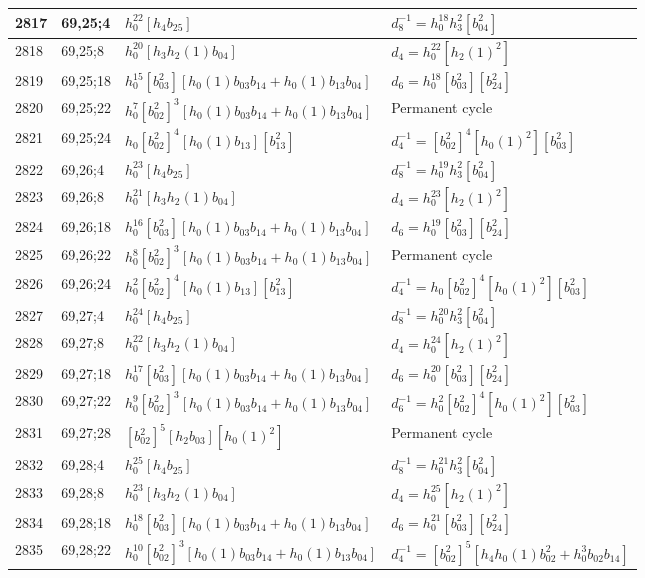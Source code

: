 \documentclass{article}
\begin{document}
\begin{longtable}{|l|l|>{\raggedright\arraybackslash}p{6cm}|>{\raggedright\arraybackslash}p{6cm}|}
\hline
2817 & 69,25;4 & $h_0^{22}[h_4b_{25}]$ & $d_{8}^{-1}=h_0^{18}h_3^2[b_{04}^2]$\\
\hline
2818 & 69,25;8 & $h_0^{20}[h_3h_2(1)b_{04}]$ &$d_{4}=h_0^{22}[h_2(1)^2]$\\
\hline
2819 & 69,25;18 & $h_0^{15}[b_{03}^2][h_0(1)b_{03}b_{14} + h_0(1)b_{13}b_{04}]$ &$d_{6}=h_0^{18}[b_{03}^2][b_{24}^2]$\\
\hline
2820 & 69,25;22 & $h_0^7[b_{02}^2]^3[h_0(1)b_{03}b_{14} + h_0(1)b_{13}b_{04}]$ & Permanent cycle\\
\hline
2821 & 69,25;24 & $h_0[b_{02}^2]^4[h_0(1)b_{13}][b_{13}^2]$ & $d_{4}^{-1}=[b_{02}^2]^4[h_0(1)^2][b_{03}^2]$\\
\hline
2822 & 69,26;4 & $h_0^{23}[h_4b_{25}]$ & $d_{8}^{-1}=h_0^{19}h_3^2[b_{04}^2]$\\
\hline
2823 & 69,26;8 & $h_0^{21}[h_3h_2(1)b_{04}]$ &$d_{4}=h_0^{23}[h_2(1)^2]$\\
\hline
2824 & 69,26;18 & $h_0^{16}[b_{03}^2][h_0(1)b_{03}b_{14} + h_0(1)b_{13}b_{04}]$ &$d_{6}=h_0^{19}[b_{03}^2][b_{24}^2]$\\
\hline
2825 & 69,26;22 & $h_0^8[b_{02}^2]^3[h_0(1)b_{03}b_{14} + h_0(1)b_{13}b_{04}]$ & Permanent cycle\\
\hline
2826 & 69,26;24 & $h_0^2[b_{02}^2]^4[h_0(1)b_{13}][b_{13}^2]$ & $d_{4}^{-1}=h_0[b_{02}^2]^4[h_0(1)^2][b_{03}^2]$\\
\hline
2827 & 69,27;4 & $h_0^{24}[h_4b_{25}]$ & $d_{8}^{-1}=h_0^{20}h_3^2[b_{04}^2]$\\
\hline
2828 & 69,27;8 & $h_0^{22}[h_3h_2(1)b_{04}]$ &$d_{4}=h_0^{24}[h_2(1)^2]$\\
\hline
2829 & 69,27;18 & $h_0^{17}[b_{03}^2][h_0(1)b_{03}b_{14} + h_0(1)b_{13}b_{04}]$ &$d_{6}=h_0^{20}[b_{03}^2][b_{24}^2]$\\
\hline
2830 & 69,27;22 & $h_0^9[b_{02}^2]^3[h_0(1)b_{03}b_{14} + h_0(1)b_{13}b_{04}]$ & $d_{6}^{-1}=h_0^2[b_{02}^2]^4[h_0(1)^2][b_{03}^2]$\\
\hline
2831 & 69,27;28 & $[b_{02}^2]^5[h_2b_{03}][h_0(1)^2]$ & Permanent cycle\\
\hline
2832 & 69,28;4 & $h_0^{25}[h_4b_{25}]$ & $d_{8}^{-1}=h_0^{21}h_3^2[b_{04}^2]$\\
\hline
2833 & 69,28;8 & $h_0^{23}[h_3h_2(1)b_{04}]$ &$d_{4}=h_0^{25}[h_2(1)^2]$\\
\hline
2834 & 69,28;18 & $h_0^{18}[b_{03}^2][h_0(1)b_{03}b_{14} + h_0(1)b_{13}b_{04}]$ &$d_{6}=h_0^{21}[b_{03}^2][b_{24}^2]$\\
\hline
2835 & 69,28;22 & $h_0^{10}[b_{02}^2]^3[h_0(1)b_{03}b_{14} + h_0(1)b_{13}b_{04}]$ & $d_{4}^{-1}=[b_{02}^2]^5[h_4h_0(1)b_{02}^2 + h_0^3b_{02}b_{14}]$\\

\end{longtable}
\end{document}
